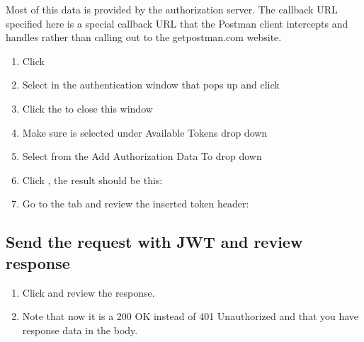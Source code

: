 \documentclass[letterpaper,10pt,english]{sphinxmanual}
\begin{document}
Most of this data is provided by the authorization server. The callback
URL specified here is a special callback URL that the Postman client
intercepts and handles rather than calling out to the getpostman.com
website.
\begin{quote}

\noindent{}
\end{quote}
\begin{enumerate}
\item {} 
Click 

\item {} 
Select  in the authentication window that pops up and
click 

\item {} 
Click the  to close this window

\item {} 
Make sure  is selected under Available Tokens drop
down

\item {} 
Select  from the Add Authorization Data To drop
down

\item {} 
Click , the result should be this:

\end{enumerate}
\begin{quote}

\noindent{}
\end{quote}
\begin{enumerate}
\setcounter{enumi}{6}
\item {} 
Go to the  tab and review the inserted  token
header:

\end{enumerate}
\begin{quote}

\noindent{}
\end{quote}


\subsection{Send the request with JWT and review response}
\label{\detokenize{class1/module2/module2:send-the-request-with-jwt-and-review-response}}\begin{enumerate}
\item {} 
Click  and review the response.

\item {} 
Note that now it is a 200 OK instead of 401 Unauthorized and that you
have response data in the body.

\end{enumerate}
\begin{quote}

\noindent{}
\end{quote}
\end{document}
